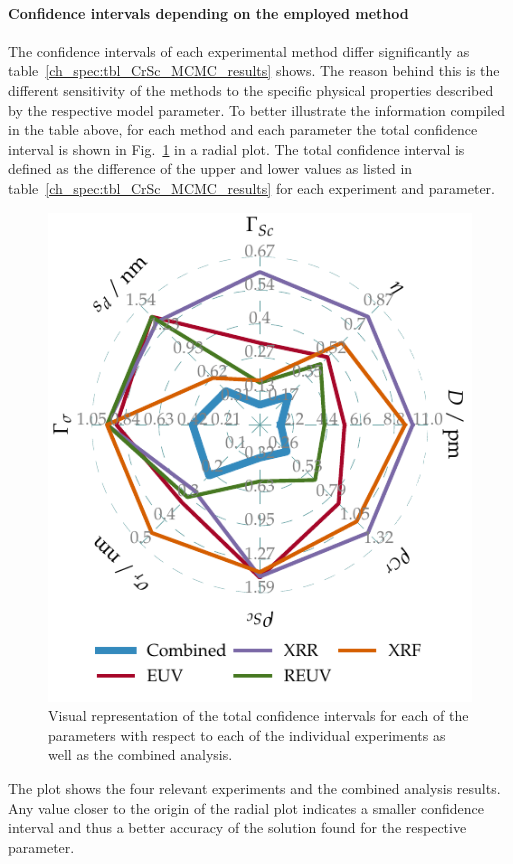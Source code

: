 \paragraph{Confidence intervals depending on the employed method}
The confidence intervals of each experimental method differ significantly as table~\ref{ch_spec:tbl_CrSc_MCMC_results} shows. The reason behind this is the different sensitivity of the methods to the specific physical properties described by the respective model parameter. To better illustrate the information compiled in the table above, for each method and each parameter the total confidence interval is shown in Fig.~\ref{ch_spec:fig_CrSc_confidence_intervals} in a radial plot. The total confidence interval is defined as the difference of the upper and lower values as listed in table~\ref{ch_spec:tbl_CrSc_MCMC_results} for each experiment and parameter.
\begin{figure}[htbp]
  \centering
\includegraphics{img/CrSc_confidence_intervals_radar}
  \caption[Radar plot representation of the Cr/Sc model parameters' confidence intervals.]{Visual representation of the total confidence intervals for each of 
the parameters with respect to each of the individual experiments as well as 
the combined analysis.}
  \label{ch_spec:fig_CrSc_confidence_intervals}
\end{figure}
The plot shows the four relevant experiments and the combined analysis results. Any value closer to the origin of the radial plot indicates a smaller confidence interval and thus a better accuracy of the solution found for the respective parameter.


